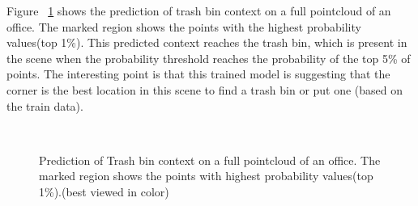Figure ~\ref{TrashPrediction.figure:edge} shows the prediction of trash bin context on a full pointcloud of an office. 
The marked region shows the points with the highest probability values(top 1\%).
This predicted context reaches the trash bin, which is present in the scene when the probability threshold reaches the 
probability of the top 5\% of points.
The interesting point is that this trained model is suggesting that the corner is the best location in this scene to find a 
trash bin or put one (based on the train data).

\begin{figure} [htp]
   \begin{center}
     \\
  \end{center}
  \caption[Prediction of Trash bin model.]
  {Prediction of Trash bin context on a full pointcloud of an office. The marked region shows the points with highest probability values(top 1\%).(best viewed in color)}
  \label{TrashPrediction.figure:edge}
\end{figure}

